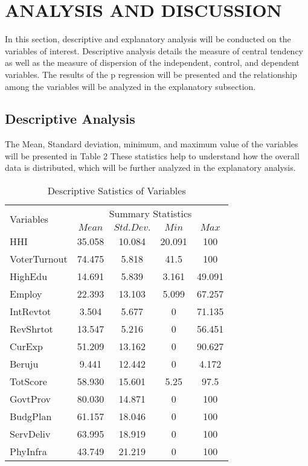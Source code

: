 \newpage
\section{ANALYSIS AND DISCUSSION}
In this section, descriptive and explanatory analysis will be conducted on the variables of interest. Descriptive analysis details the measure of central tendency as well as the measure of dispersion of the independent, control, and dependent variables. The results of the p regression will be presented and the relationship among the variables will be analyzed in the explanatory subsection.
\vspace{-3mm}
\subsection{Descriptive Analysis}
The Mean, Standard deviation, minimum, and maximum value of the variables will be presented in Table 2
These statistics help to understand how the overall data is distributed, which will be further analyzed in the explanatory analysis.
\begin{table}[H]
  \centering
   \begin{tabular}{lcccc}
    \hline
    \multirow{2}{*}{Variables} &\multicolumn{4}{c}{Summary Statistics}\\&{$Mean$} & {$Std. Dev.$}  & {$Min$} & {$Max$} \\
        \hline
    HHI & 35.058 &10.084&  20.091  & 100\\
    VoterTurnout & 74.475 &5.818 &  41.5&100 \\
    HighEdu & 14.691 & 5.839& 3.161& 49.091\\
    Employ & 22.393 & 13.103 & 5.099 & 67.257\\
    IntRevtot &3.504 &5.677 &0 &71.135\\
    RevShrtot & 13.547 &5.216& 0  & 56.451\\
    CurExp & 51.209& 13.162& 0  & 90.627\\
    Beruju &9.441& 12.442& 0  & 4.172\\
    TotScore & 58.930 & 15.601 & 5.25 & 97.5\\
    GovtProv & 80.030 & 14.871 & 0 & 100\\
    BudgPlan & 61.157 & 18.046 & 0 & 100\\
    ServDeliv & 63.995 & 18.919 & 0 & 100\\
     PhyInfra & 43.749 & 21.219 & 0 & 100\\
    \hline
    \end{tabular}
    \caption{Descriptive Satistics of Variables }  
     \label{Descriptive Statistics of Variables }
\end{table} 
